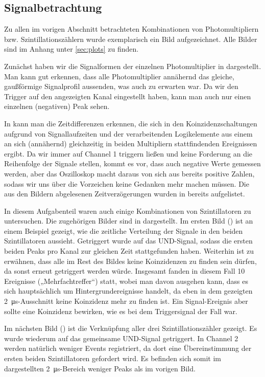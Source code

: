 \subsection{Signalbetrachtung}
Zu allen im vorigen Abschnitt betrachteten Kombinationen von Photomultipliern
bzw. Szintillationszählern wurde exemplarisch ein Bild aufgezeichnet. Alle
Bilder sind im Anhang unter \ref{sec:plots} zu finden.

Zunächst haben wir die Signalformen der einzelnen Photomultiplier in 
dargestellt. Man kann gut erkennen, dass alle Photomultiplier annähernd das
gleiche, gaußförmige Signalprofil aussenden, was auch zu erwarten war. Da wir
den Trigger auf den angezeigten Kanal eingestellt haben, kann man auch nur einen
einzelnen (negativen) Peak sehen.

In  kann man die Zeitdifferenzen erkennen, die sich in
den Koinzidenzschaltungen aufgrund von Signallaufzeiten und der verarbeitenden
Logikelemente aus einem an sich (annähernd) gleichzeitig in beiden Multipliern
stattfindenden Ereignissen ergibt. Da wir immer auf Channel 1 triggern ließen
und keine Forderung an die Reihenfolge der Signale stellen, kommt es vor, dass
auch negative Werte gemessen werden, aber das Oszilloskop macht daraus von sich
aus bereits positive Zahlen, sodass wir uns über die Vorzeichen keine Gedanken
mehr machen müssen. Die aus den Bildern abgelesenen Zeitverzögerungen wurden in
 bereits aufgelistet.

In diesem Aufgabenteil waren auch einige Kombinationen von Szintillatoren zu
untersuchen. Die zugehörigen Bilder sind in  dargestellt.
Im ersten Bild () ist an einem Beispiel gezeigt, wie die
zeitliche Verteilung der Signale in den beiden Szintillatoren aussieht.
Getriggert wurde auf das UND-Signal, sodass die ersten beiden Peaks pro Kanal
zur gleichen Zeit stattgefunden haben. Weiterhin ist zu erwähnen, dass alle im
Rest des Bildes keine Koinzidenzen zu finden sein dürfen, da sonst erneut
getriggert werden würde. Insgesamt fanden in diesem Fall 10 Ereignisse
(„Mehrfachtreffer“) statt,
wobei man davon ausgehen kann, dass es sich hauptsächlich um
Hintergrundereignisse handelt, da eben in dem gezeigten
\SI{2}{\micro\second}-Ausschnitt keine Koinzidenz mehr zu finden ist. Ein
Signal-Ereignis aber sollte eine Koinzidenz bewirken, wie es bei dem
Triggersignal der Fall war.

Im nächsten Bild () ist die Verknüpfung aller drei
Szintillationszähler gezeigt. Es wurde wiederum auf das gemeinsame UND-Signal
getriggert. In Channel 2 werden natürlich weniger Events registriert, da dort
eine Übereinstimmung der ersten beiden Szintillatoren gefordert wird. Es
befinden sich somit im dargestellten \SI{2}{\micro\second}-Bereich weniger
Peaks als im vorigen Bild. 

